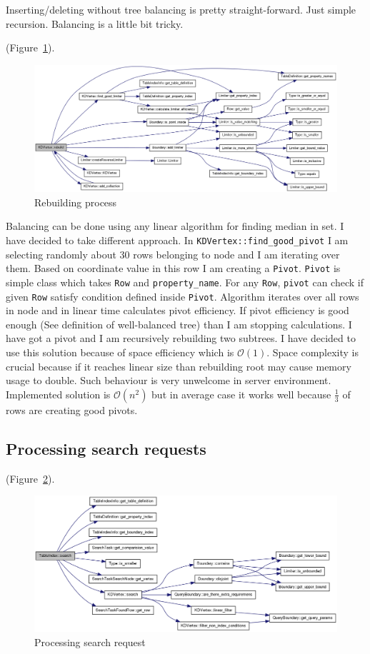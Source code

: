 \documentclass[10pt,a4paper]{article}
\newcommand{\Oh}{\mathcal{O}}
\begin{document}
Inserting/deleting without tree balancing is pretty straight-forward. Just simple recursion. Balancing is a little bit tricky. 

 (Figure~\ref{fig:rebuild}).

\begin{figure}
\centering
  \includegraphics[width=16cm]{rebuild}
  \caption{Rebuilding process}
  \label{fig:rebuild}
\end{figure}

Balancing can be done using any linear algorithm for finding median in set. I have decided to take different approach. In \verb|KDVertex::find_good_pivot| I am selecting randomly about 30 rows belonging to node and I am iterating over them. Based on coordinate value in this row I am creating a \verb|Pivot|. \verb|Pivot| is simple class which takes \verb|Row| and \verb|property_name|. For any \verb|Row|, \verb|pivot| can check if given \verb|Row| satisfy condition defined inside \verb|Pivot|. Algorithm iterates over all rows in node and in linear time calculates pivot efficiency. If pivot efficiency is good enough (See definition of well-balanced tree) than I am stopping calculations. I have got a pivot and I am recursively rebuilding two subtrees. I have decided to use this solution because of space efficiency which is $\Oh(1)$. Space complexity is crucial because if it reaches linear size than rebuilding root may cause memory usage to double. Such behaviour is very unwelcome in server environment. Implemented solution is $\Oh(n^2)$ but in average case it works well because $\frac{1}{3}$ of rows are creating good pivots.

\subsection{Processing search requests}

 (Figure~\ref{fig:search}).

\begin{figure}
\centering
  \includegraphics[width=16cm]{search}
  \caption{Processing search request}
  \label{fig:search}
\end{figure}
\end{document}
